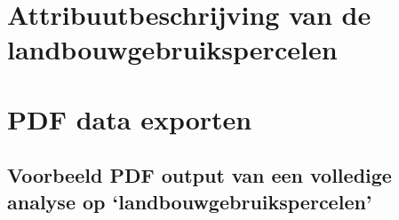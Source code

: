 \documentclass[dutch,dit,thesis]{hogentreport}
\begin{document}
%
\chapter{Attribuutbeschrijving van de landbouwgebruikspercelen}


\chapter{PDF data exporten}

\section{Voorbeeld PDF output van een volledige analyse op `landbouwgebruikspercelen'}\label{app:full_anal}





\backmatter{}

\setlength\bibitemsep{2pt} %
\printbibliography[heading=bibintoc]
\end{document}
